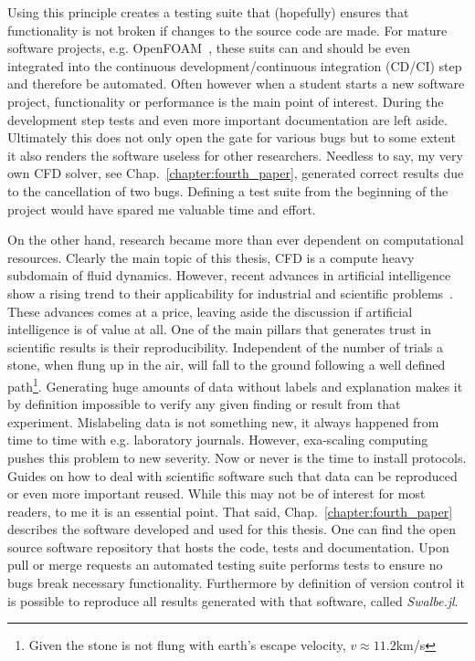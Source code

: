 Using this principle creates a testing suite that (hopefully) ensures that functionality is not broken if changes to the source code are made.
For mature software projects, e.g. OpenFOAM~\cite{jasakOpenFOAMLibraryComplex, jasakOpenFOAMOpenSource2009, chenOpenFOAMComputationalFluid2014}, these suits can and should be even integrated into the continuous development/continuous integration (CD/CI) step and therefore be automated.
Often however when a student starts a new software project, functionality or performance is the main point of interest.
During the development step tests and even more important documentation are left aside.
Ultimately this does not only open the gate for various bugs but to some extent it also renders the software useless for other researchers.
Needless to say, my very own CFD solver, see Chap.~\ref{chapter:fourth_paper}, generated correct results due to the cancellation of two bugs.
Defining a test suite from the beginning of the project would have spared me valuable time and effort.

On the other hand, research became more than ever dependent on computational resources.
Clearly the main topic of this thesis, CFD is a compute heavy subdomain of fluid dynamics. 
However, recent advances in artificial intelligence show a rising trend to their applicability for industrial and scientific problems~\cite{acemogluArtificialIntelligenceAutomation2018, beintemaControllingRayleighBenard2020}.
These advances comes at a price, leaving aside the discussion if artificial intelligence is of value at all.
One of the main pillars that generates trust in scientific results is their reproducibility.
Independent of the number of trials a stone, when flung up in the air, will fall to the ground following a well defined path\footnote{Given the stone is not flung with earth's escape velocity, $v\approx 11.2$km/s}.
Generating huge amounts of data without labels and explanation makes it by definition impossible to verify any given finding or result from that experiment.
Mislabeling data is not something new, it always happened from time to time with e.g. laboratory journals.
However, exa-scaling computing pushes this problem to new severity.
Now or never is the time to install protocols. 
Guides on how to deal with scientific software such that data can be reproduced or even more important reused.
While this may not be of interest for most readers, to me it is an essential point.
That said, Chap.~\ref{chapter:fourth_paper} describes the software developed and used for this thesis. 
One can find the open source software repository that hosts the code, tests and documentation.
Upon pull or merge requests an automated testing suite performs tests to ensure no bugs break necessary functionality.
Furthermore by definition of version control it is possible to reproduce all results generated with that software, called \textit{Swalbe.jl}.

